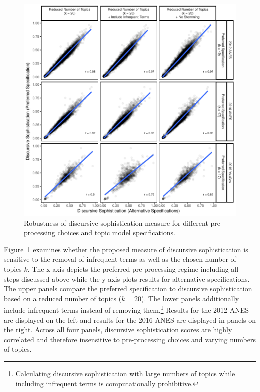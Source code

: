\begin{figure}[h]\centering
\includegraphics{../fig/pretext_robustness.pdf}
\caption{Robustness of discursive sophistication measure for different pre-processing choices and topic model specifications.}\label{fig:pretext_robustness}
\end{figure}

Figure~\ref{fig:pretext_robustness} examines whether the proposed measure of discursive sophistication is sensitive to the removal of infrequent terms as well as the chosen number of topics $k$. The x-axis depicts the preferred pre-processing regime including all steps discussed above while the y-axis plots results for alternative specifications. The upper panels compare the preferred specification to discursive sophistication based on a reduced number of topics ($k=20$). The lower panels additionally include infrequent terms instead of removing them.\footnote{Calculating discursive sophistication with large numbers of topics while including infrequent terms is computationally prohibitive.} Results for the 2012 ANES are displayed on the left and results for the 2016 ANES are displayed in panels on the right. Across all four panels, discursive sophistication scores are highly correlated and therefore insensitive to pre-processing choices and varying numbers of topics.

